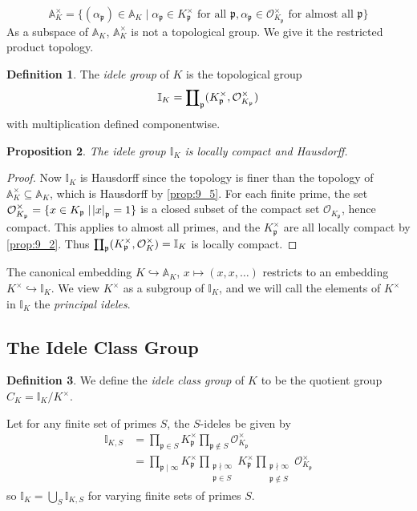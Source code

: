 \documentclass[11pt]{article}
\theoremstyle{definition}
\newtheorem{definition}{Definition}[section]
\theoremstyle{plain}
\newtheorem{proposition}[definition]{Proposition}
\theoremstyle{remark}
\newcommand{\bA}{\mathbb{A}}
\newcommand{\II}{\mathbb{I}}
\newcommand{\cO}{\mathcal{O}}
\newcommand{\fp}{\mathfrak{p}}
\newcommand{\rprod}{\mathrlap{\prod}{\coprod}}
\begin{document}
\begin{equation*}
    \bA_K^\times = \{(\alpha_\fp) \in \bA_K \mid \alpha_\fp \in K_\fp^\times \text{ for all } \fp, \alpha_\fp \in \cO_{K_\fp}^\times \text{ for almost all } \fp\}
\end{equation*}
As a subspace of $\bA_K$, $\bA_K^\times$ is not a topological group. We give it the restricted product topology.

\begin{definition}\label{def:9_6}
    The \emph{idele group} of $K$ is the topological group
    \begin{equation*}
        \II_K = \rprod_{\fp} (K_\fp^\times, \cO_{K_\fp}^\times)
    \end{equation*}
    with multiplication defined componentwise.
\end{definition}

\begin{proposition}\label{prop:9_7}
    The idele group $\II_K$ is locally compact and Hausdorff.
\end{proposition}
\begin{proof}
    Now $\II_K$ is Hausdorff since the topology is finer than the topology of $\bA_K^\times \subseteq \bA_K$, which is Hausdorff by \autoref{prop:9_5}. For each finite prime, the set $\cO_{K_\fp}^\times = \{x \in K_\fp \mid \abs{x}_\fp = 1\}$ is a closed subset of the compact set $\cO_{K_\fp}$, hence compact. This applies to almost all primes, and the $K_\fp^\times$ are all locally compact by \autoref{prop:9_2}. Thus $\rprod_\fp (K_\fp^\times, \cO_K^\times) = \II_K$ is locally compact.
\end{proof}

The canonical embedding $K \hookrightarrow \bA_K$, $x \mapsto (x, x, \ldots)$ restricts to an embedding $K^\times \hookrightarrow \II_K$. We view $K^\times$ as a subgroup of $\II_K$, and we will call the elements of $K^\times$ in $\II_K$ the \emph{principal ideles}.

\subsection{The Idele Class Group}

\begin{definition}\label{def:9_8}
    We define the \emph{idele class group} of $K$ to be the quotient group $C_K = \II_K / K^\times$.
\end{definition}

Let for any finite set of primes $S$, the $S$-ideles be given by
\begin{align*}
    \II_{K,S}
    &= \prod_{\fp \in S} K_{\fp}^\times \prod_{\fp \notin S} \cO_{K_\fp}^\times\\
    &= \prod_{\fp \mid \infty} K_{\fp}^\times \prod_{\substack{\fp \nmid \infty \\ \fp \in S}} K_{\fp}^\times \prod_{\substack{\fp \nmid \infty \\ \fp \notin S}} \cO_{K_\fp}^\times
\end{align*}
so $\II_K = \bigcup_{S} \II_{K,S}$ for varying finite sets of primes $S$.
\end{document}
